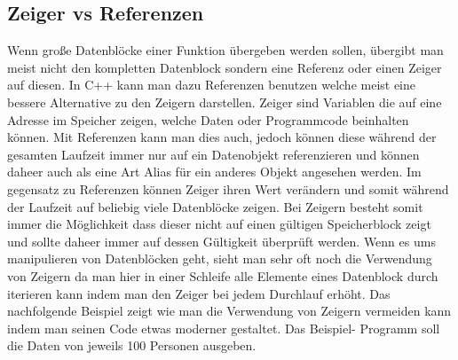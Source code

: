 \documentclass[MES,Master,ngerman]{twbook}%
\begin{document}
\subsection{Zeiger vs Referenzen}
Wenn große Datenblöcke einer Funktion übergeben werden sollen, übergibt man meist nicht den kompletten Datenblock sondern eine Referenz oder einen Zeiger auf diesen. In C++ kann man dazu Referenzen benutzen welche meist eine bessere Alternative zu den Zeigern darstellen. Zeiger sind Variablen die auf eine Adresse im Speicher zeigen, welche Daten oder Programmcode beinhalten können. Mit Referenzen kann man dies auch, jedoch können diese während der gesamten Laufzeit immer nur auf ein Datenobjekt referenzieren und können daheer auch als eine Art Alias für ein anderes Objekt angesehen werden. Im gegensatz zu Referenzen können Zeiger ihren Wert verändern und somit während der Laufzeit auf beliebig viele Datenblöcke zeigen. Bei Zeigern besteht somit immer die Möglichkeit dass dieser nicht auf einen gültigen Speicherblock zeigt und sollte daheer immer auf dessen Gültigkeit überprüft werden. \newline \newline
Wenn es ums manipulieren von Datenblöcken geht, sieht man sehr oft noch die Verwendung von Zeigern da man hier in einer Schleife alle Elemente eines Datenblock durch iterieren kann indem man den Zeiger bei jedem Durchlauf erhöht. Das nachfolgende Beispiel zeigt wie man die Verwendung von Zeigern vermeiden kann indem man seinen Code etwas moderner gestaltet. Das Beispiel- Programm soll die Daten von jeweils 100 Personen ausgeben.\newline

\begin{figure}[!htb]
	\begin{subfigure}[b]{0.5\textwidth}
		
		\label{fig:13}
	\end{subfigure}
	\begin{subfigure}[b]{0.5\textwidth}
		
		\label{fig:14}
	\end{subfigure}
\end{figure}
\end{document}
